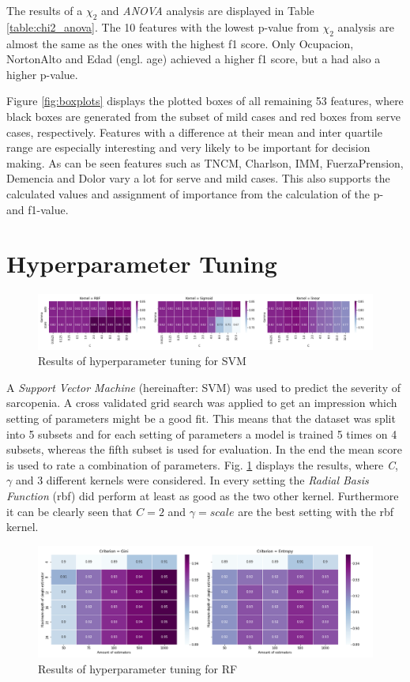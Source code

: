 \documentclass[11pt]{article}
\begin{document}
The results of a $\chi_2$ and \emph{ANOVA} analysis are displayed in Table \ref{table:chi2_anova}. The 10 features with the lowest p-value from $\chi_2$ analysis are almost the same as the ones with the highest f1 score. Only Ocupacion, NortonAlto and Edad (engl. age) achieved a higher f1 score, but a had also a higher p-value.


Figure \ref{fig:boxplots} displays the plotted boxes of all remaining 53 features, where black boxes are generated from the subset of mild cases and red boxes from serve cases, respectively. Features with a difference at their mean and inter quartile range are especially interesting and very likely to be important for decision making. As can be seen features such as TNCM, Charlson, IMM, FuerzaPrension, Demencia and Dolor vary a lot for serve and mild cases. This also supports the calculated values and assignment of importance from the calculation of the p- and f1-value.

\section{Hyperparameter Tuning}
\begin{figure}[t]
\includegraphics[width=\linewidth]{heatmap_svc_hyperparameter.png}
\caption{Results of hyperparameter tuning for SVM}
\label{fig:hyper_svc}
\end{figure}

A \emph{Support Vector Machine} (hereinafter: SVM) was used to predict the severity of sarcopenia. A cross validated grid search was applied to get an impression which setting of parameters might be a good fit. This means that the dataset was split into 5 subsets and for each setting of parameters a model is trained 5 times on 4 subsets, whereas the fifth subset is used for evaluation. In the end the mean score is used to rate a combination of parameters. Fig. \ref{fig:hyper_svc} displays the results, where \emph{C}, $\gamma$ and 3 different kernels were considered. In every setting the \emph{Radial Basis Function} (rbf) did perform at least as good as the two other kernel. Furthermore it can be clearly seen that $C=2$ and $\gamma=scale$ are the best setting with the rbf kernel.

\begin{figure}[t]
\includegraphics[width=\linewidth]{heatmap_rf_hyperparameter.png}
\caption{Results of hyperparameter tuning for RF}
\label{fig:hyper_rf}
\end{figure}
\end{document}
